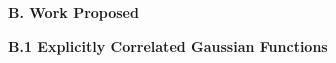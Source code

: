 




\vspace{3mm}
\noindent
{\bf B. Work Proposed}

{\bf B.1 Explicitly Correlated Gaussian Functions}

